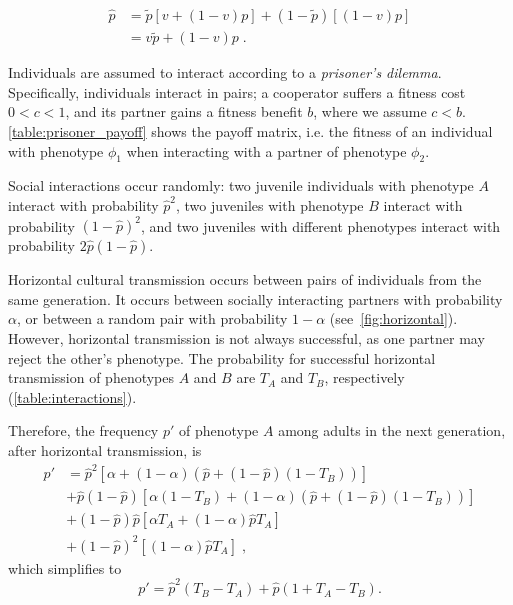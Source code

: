\documentclass[12pt]{extarticle}
\begin{document}
\begin{equation}\label{eq:horizontal}
\begin{aligned}
\hat{p}
& = \tilde{p} [v + (1-v)p] + (1-\tilde{p}) [(1-v)p] \\
& = v \tilde{p} + (1-v) p \;.
\end{aligned}
\end{equation}

Individuals are assumed to interact according to a \emph{prisoner's dilemma}.
Specifically, individuals interact in pairs; a cooperator suffers a fitness cost $0<c<1$, and its partner gains a fitness benefit $b$, where we assume $c<b$. \autoref{table:prisoner_payoff} shows the payoff matrix, i.e. the fitness of an individual with phenotype $\phi_1$ when interacting with a partner of phenotype $\phi_2$.

Social interactions occur randomly:
two juvenile individuals with phenotype $A$ interact with probability $\hat{p}^2$, two juveniles with phenotype $B$ interact with probability $(1-\hat{p})^2$, and two juveniles with different phenotypes interact with probability $2\hat{p}(1-\hat{p})$. 

Horizontal cultural transmission occurs between pairs of individuals from the same generation. 
It occurs between socially interacting partners with probability $\alpha$, or between a random pair with probability $1-\alpha$ (see~\autoref{fig:horizontal}).
However, horizontal transmission is not always successful, as one partner may reject the other's phenotype. The probability for successful horizontal transmission of phenotypes $A$ and $B$ are $T_A$ and $T_B$, respectively (\autoref{table:interactions}).

Therefore, the frequency $p'$ of phenotype $A$ among adults in the next generation, after horizontal transmission, is 
\begin{equation}\label{eq:nextgen_adults}
\begin{aligned}
p'
& = \hat{p}^2 [\alpha + (1-\alpha)(\hat{p} + (1-\hat{p})(1-T_B))] \\
& + \hat{p}(1-\hat{p}) [\alpha(1-T_B) + (1-\alpha)(\hat{p} + (1-\hat{p})(1-T_B))] \\
& + (1-\hat{p})\hat{p} [\alpha T_A + (1-\alpha) \hat{p} T_A ] \\
& + (1-\hat{p})^2 [(1-\alpha) \hat{p} T_A] \;,
\end{aligned}
\end{equation}
which simplifies to
\begin{equation}\label{eq:nextgen_adults_slimpify}
p' = \hat{p}^2(T_B-T_A) + \hat{p}(1+T_A-T_B) .
\end{equation}
\end{document}
